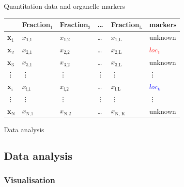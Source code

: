 \begin{frame}{Quantitation data and organelle markers}
  \begin{center}
    \begin{tabular}{|l|llll||l|}
      \hline
      & Fraction$_{\text{1}}$ & Fraction$_{\text{2}}$ & \ldots{} & Fraction$_{\text{L}}$ & markers\\
      \hline
      {\bf x}$_{\text{1}}$ & $x_{\text{1,1}}$ & $x_{\text{1,2}}$ & \ldots{} & $x_{\text{1,L}}$ & unknown \\
      {\bf x}$_{\text{2}}$ & $x_{\text{2,1}}$ & $x_{\text{2,2}}$ & \ldots{} & $x_{\text{2,L}}$ & \textcolor{Red}{$loc_{1}$}\\
      {\bf x}$_{\text{3}}$ & $x_{\text{3,1}}$ & $x_{\text{3,2}}$ & \ldots{} & $x_{\text{3,L}}$ & unknown \\
      \vdots & \vdots & \vdots & \vdots & \vdots & \vdots \\
      {\bf x}$_{\text{i}}$ & $x_{\text{i,1}}$ & $x_{\text{i,2}}$ & \ldots{} & $x_{\text{i,L}}$ & \textcolor{Blue}{$loc_{k}$}\\
      \vdots & \vdots & \vdots & \vdots & \vdots & \vdots\\
      {\bf x}$_{\text{N}}$ & $x_{\text{N,1}}$ & $x_{\text{N,2}}$ & \ldots{} & $x_{\text{N, K}}$ & unknown \\
      \hline
    \end{tabular}
  \end{center}
\end{frame}

\begin{frame}{}
  \begin{center}
    \Large{Data analysis}
  \end{center}
\end{frame}


\subsection*{Data analysis}
\label{sec:comp}

\subsubsection*{Visualisation}
\label{sec:viz}

